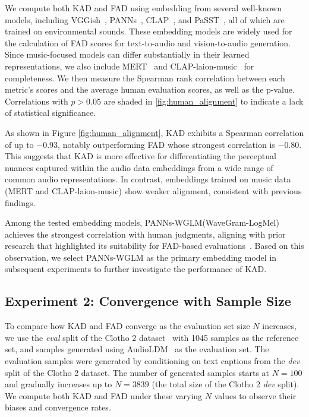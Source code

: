We compute both KAD and FAD using embedding from several well-known models, including VGGish~\cite{vggish}, PANNs~\cite{panns}, CLAP~\cite{clap_ms, clap_laion}, and PaSST~\cite{passt}, all of which are trained on environmental sounds. These embedding models are widely used for the calculation of FAD scores for text-to-audio \cite{donahue2018adversarial,liu2023audioldm,huang2023makeanaudio,tango,audiogen,t-foley,audioldm2,consistencytta,tango2,tango_llm,auffusion,stableaudio_open,ezaudio} and vision-to-audio generation\cite{comunita2024syncfusion,video-foley,rewas,frieren,maskvat,v-aura,vatt,multifoley,ssv2a,vintage,mmaudio,clipsonic,v2a-mapper,im2wav,foleygen,tiva}. Since music-focused models can differ substantially in their learned representations, we also include MERT~\cite{mert} and CLAP-laion-music~\cite{clap_laion} for completeness. We then measure the Spearman rank correlation between each metric's scores and the average human evaluation scores, as well as the p-value. Correlations with $p > 0.05$ are shaded in \ref{fig:human_alignment} to indicate a lack of statistical significance.

As shown in Figure \ref{fig:human_alignment}, KAD exhibits a Spearman correlation of up to $-0.93$, notably outperforming FAD whose strongest correlation is $-0.80$. This suggests that KAD is more effective for differentiating the perceptual nuances captured within the audio data embeddings from a wide range of common audio representations. In contrast, embeddings trained on music data (MERT and CLAP-laion-music) show weaker alignment, consistent with previous findings\cite{tailleur2024correlation}. 


Among the tested embedding models, PANNs-WGLM(WaveGram-LogMel) achieves the strongest correlation with human judgments, aligning with prior research that highlighted its suitability for FAD-based evaluations~\cite{tailleur2024correlation}. Based on this observation, we select PANNs-WGLM as the primary embedding model in subsequent experiments to further investigate the performance of KAD.
  

\subsection{Experiment 2: Convergence with Sample Size}

To compare how KAD and FAD converge as the evaluation set size $N$ increases, we use the \textit{eval} split of the Clotho 2 dataset~\cite{drossos2020clotho} with 1045 samples as the reference set, and samples generated using AudioLDM~\cite{liu2023audioldm} as the evaluation set. The evaluation samples were generated by conditioning on text captions from the \textit{dev} split of the Clotho 2 dataset. The number of generated samples starts at $N=100$ and gradually increases up to $N=3839$ (the total size of the Clotho 2 \textit{dev} split). We compute both KAD and FAD under these varying $N$ values to observe their biases and convergence rates. 

